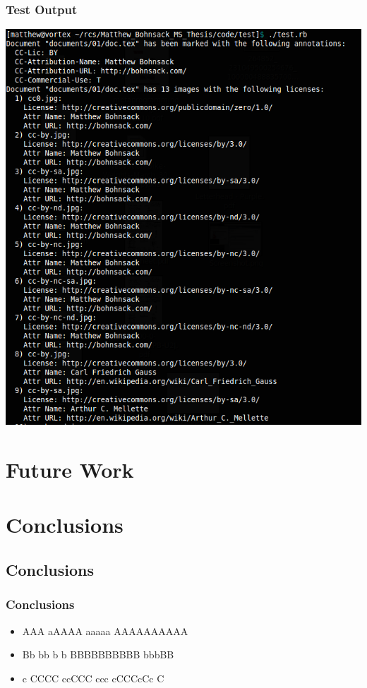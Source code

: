 \documentclass[mathserif,xcolor=dvipsnames,hyperref={bookmarks=true}]{beamer}
\begin{document}
    \begin{frame}[t]
        \frametitle{Test Output}
        \begin{center}
            \includegraphics[height=0.85\textheight]{test-output.png}
        \end{center}
    \end{frame}

\section{Future Work}

\section{Conclusions}
    \subsection{Conclusions}
    \begin{frame}[t]
        \frametitle{Conclusions}
        \begin{itemize}
            \item<2-> AAA aAAAA aaaaa AAAAAAAAAA
            \item<3-> Bb bb b b BBBBBBBBBB bbbBB
            \item<4-> c CCCC ccCCC ccc cCCCcCc C
        \end{itemize}
    \end{frame}
\end{document}
